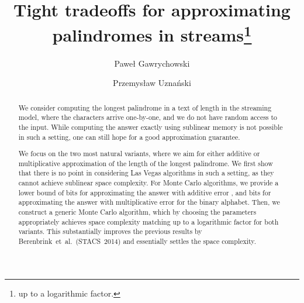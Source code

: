 \documentclass{article}[11pt,letter]
\newcommand{\etal}{et~al.}
\begin{document}
\title{Tight tradeoffs for approximating palindromes in streams\footnote{up to a logarithmic factor.}}



\author[1]{Paweł Gawrychowski}
\author[2]{Przemysław Uznański}

\date{}

\maketitle

\begin{abstract}
We consider computing the longest palindrome in a text of length  in the streaming model, where
the characters arrive one-by-one, and we do not have random access to the input. While 
computing the answer exactly using sublinear memory is not possible in such a setting, one can still hope for a good approximation guarantee.

We focus on the two most natural variants, where we aim for either additive or multiplicative approximation
of the length of the longest palindrome. We first show that there is no point in considering
Las Vegas algorithms in such a setting, as they cannot achieve sublinear space complexity.
For Monte Carlo algorithms, we provide a lower bound of  bits for
approximating the answer with additive error , and   bits for 
approximating the answer with multiplicative error  for the binary alphabet.
Then, we construct a generic Monte Carlo algorithm, which by 
choosing the parameters appropriately achieves space complexity matching up to a logarithmic factor for
both variants.
This substantially improves the previous results by Berenbrink~\etal~(STACS~2014) and essentially settles
the space complexity.
\end{abstract}
\end{document}
